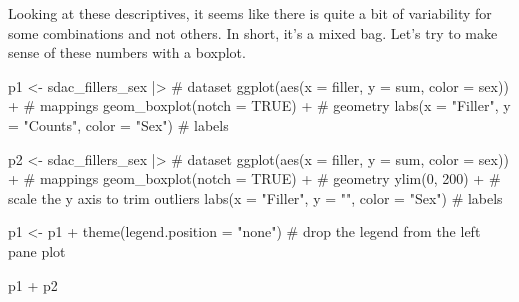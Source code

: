 \documentclass[
  letterpaper,
]{latex/krantz}
\newenvironment{Shaded}{\begin{snugshade}}{\end{snugshade}}
\newcommand{\AttributeTok}[1]{\textcolor[rgb]{0.40,0.45,0.13}{#1}}
\newcommand{\CommentTok}[1]{\textcolor[rgb]{0.37,0.37,0.37}{#1}}
\newcommand{\ConstantTok}[1]{\textcolor[rgb]{0.56,0.35,0.01}{#1}}
\newcommand{\DecValTok}[1]{\textcolor[rgb]{0.68,0.00,0.00}{#1}}
\newcommand{\FunctionTok}[1]{\textcolor[rgb]{0.28,0.35,0.67}{#1}}
\newcommand{\NormalTok}[1]{\textcolor[rgb]{0.00,0.23,0.31}{#1}}
\newcommand{\OtherTok}[1]{\textcolor[rgb]{0.00,0.23,0.31}{#1}}
\newcommand{\SpecialCharTok}[1]{\textcolor[rgb]{0.37,0.37,0.37}{#1}}
\newcommand{\StringTok}[1]{\textcolor[rgb]{0.13,0.47,0.30}{#1}}
\begin{document}
Looking at these descriptives, it seems like there is quite a bit of
variability for some combinations and not others. In short, it's a mixed
bag. Let's try to make sense of these numbers with a boxplot.

\begin{Shaded}
\begin{Highlighting}[]
\NormalTok{p1 }\OtherTok{\textless{}{-}} 
\NormalTok{  sdac\_fillers\_sex }\SpecialCharTok{|\textgreater{}} \CommentTok{\# dataset}
  \FunctionTok{ggplot}\NormalTok{(}\FunctionTok{aes}\NormalTok{(}\AttributeTok{x =}\NormalTok{ filler, }\AttributeTok{y =}\NormalTok{ sum, }\AttributeTok{color =}\NormalTok{ sex)) }\SpecialCharTok{+} \CommentTok{\# mappings}
  \FunctionTok{geom\_boxplot}\NormalTok{(}\AttributeTok{notch =} \ConstantTok{TRUE}\NormalTok{) }\SpecialCharTok{+} \CommentTok{\# geometry}
  \FunctionTok{labs}\NormalTok{(}\AttributeTok{x =} \StringTok{"Filler"}\NormalTok{, }\AttributeTok{y =} \StringTok{"Counts"}\NormalTok{, }\AttributeTok{color =} \StringTok{"Sex"}\NormalTok{) }\CommentTok{\# labels}

\NormalTok{p2 }\OtherTok{\textless{}{-}} 
\NormalTok{  sdac\_fillers\_sex }\SpecialCharTok{|\textgreater{}} \CommentTok{\# dataset}
  \FunctionTok{ggplot}\NormalTok{(}\FunctionTok{aes}\NormalTok{(}\AttributeTok{x =}\NormalTok{ filler, }\AttributeTok{y =}\NormalTok{ sum, }\AttributeTok{color =}\NormalTok{ sex)) }\SpecialCharTok{+} \CommentTok{\# mappings}
  \FunctionTok{geom\_boxplot}\NormalTok{(}\AttributeTok{notch =} \ConstantTok{TRUE}\NormalTok{) }\SpecialCharTok{+} \CommentTok{\# geometry}
  \FunctionTok{ylim}\NormalTok{(}\DecValTok{0}\NormalTok{, }\DecValTok{200}\NormalTok{) }\SpecialCharTok{+} \CommentTok{\# scale the y axis to trim outliers}
  \FunctionTok{labs}\NormalTok{(}\AttributeTok{x =} \StringTok{"Filler"}\NormalTok{, }\AttributeTok{y =} \StringTok{""}\NormalTok{, }\AttributeTok{color =} \StringTok{"Sex"}\NormalTok{) }\CommentTok{\# labels}

\NormalTok{p1 }\OtherTok{\textless{}{-}}\NormalTok{ p1 }\SpecialCharTok{+} \FunctionTok{theme}\NormalTok{(}\AttributeTok{legend.position =} \StringTok{"none"}\NormalTok{) }\CommentTok{\# drop the legend from the left pane plot}

\NormalTok{p1 }\SpecialCharTok{+}\NormalTok{ p2}
\end{Highlighting}
\end{Shaded}
\end{document}
